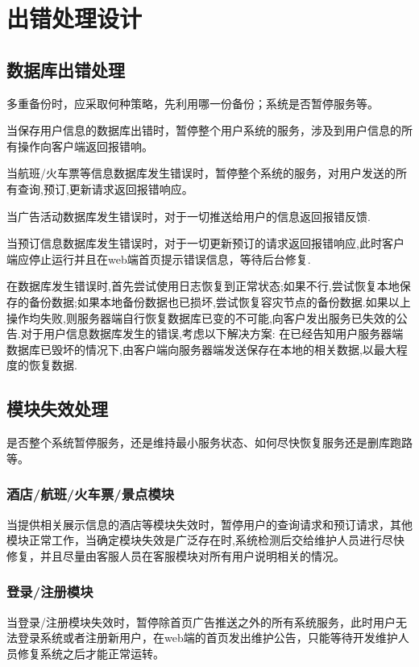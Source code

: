 \chapter{出错处理设计}
\section{数据库出错处理}
多重备份时，应采取何种策略，先利用哪一份备份；系统是否暂停服务等。

当保存用户信息的数据库出错时，暂停整个用户系统的服务，涉及到用户信息的所有操作向客户端返回报错响。

当航班/火车票等信息数据库发生错误时，暂停整个系统的服务，对用户发送的所有查询,预订,更新请求返回报错响应。

当广告活动数据库发生错误时，对于一切推送给用户的信息返回报错反馈.

当预订信息数据库发生错误时，对于一切更新预订的请求返回报错响应,此时客户端应停止运行并且在web端首页提示错误信息，等待后台修复.

在数据库发生错误时,首先尝试使用日志恢复到正常状态;如果不行,尝试恢复本地保存的备份数据;如果本地备份数据也已损坏,尝试恢复容灾节点的备份数据.如果以上操作均失败,则服务器端自行恢复数据库已变的不可能,向客户发出服务已失效的公告.对于用户信息数据库发生的错误,考虑以下解决方案:
在已经告知用户服务器端数据库已毁坏的情况下,由客户端向服务器端发送保存在本地的相关数据,以最大程度的恢复数据.

\section{模块失效处理}

是否整个系统暂停服务，还是维持最小服务状态、如何尽快恢复服务还是删库跑路等。

\subsection{酒店/航班/火车票/景点模块}

当提供相关展示信息的酒店等模块失效时，暂停用户的查询请求和预订请求，其他模块正常工作，当确定模块失效是广泛存在时,系统检测后交给维护人员进行尽快修复，并且尽量由客服人员在客服模块对所有用户说明相关的情况。

\subsection{登录/注册模块}

当登录/注册模块失效时，暂停除首页广告推送之外的所有系统服务，此时用户无法登录系统或者注册新用户，在web端的首页发出维护公告，只能等待开发维护人员修复系统之后才能正常运转。

